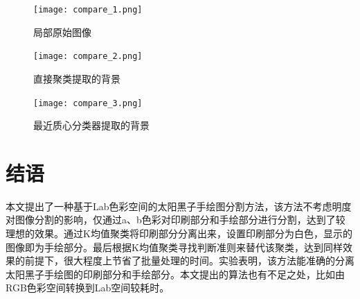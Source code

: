 \documentclass[UTF8,a4paper,twoside]{ctexart}
\begin{document}
\begin{figure}[H]
  \centering
  \begin{minipage}{5cm}
    \centering
    \texttt{[image: compare\_1.png]}
    \caption{局部原始图像}
    \label{compare_1}
  \end{minipage}
  \hspace{0.2cm}%
  \begin{minipage}{5cm}
    \centering
    \texttt{[image: compare\_2.png]}
    \caption{直接聚类提取的背景}
    \label{compare_2}
  \end{minipage}
  \hspace{0.2cm}%
  \begin{minipage}{5cm}
    \centering
    \texttt{[image: compare\_3.png]}
    \caption{最近质心分类器提取的背景}
    \label{compare_3}
  \end{minipage}
\end{figure}





\section{结语}

本文提出了一种基于Lab色彩空间的太阳黑子手绘图分割方法，该方法不考虑明度对图像分割的影响，仅通过a、b色彩对印刷部分和手绘部分进行分割，达到了较理想的效果。通过K均值聚类将印刷部分分离出来，设置印刷部分为白色，显示的图像即为手绘部分。最后根据K均值聚类寻找判断准则来替代该聚类，达到同样效果的前提下，很大程度上节省了批量处理的时间。实验表明，该方法能准确的分离太阳黑子手绘图的印刷部分和手绘部分。本文提出的算法也有不足之处，比如由RGB色彩空间转换到Lab空间较耗时。





\end{document}

